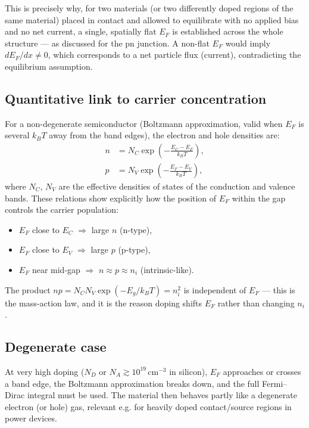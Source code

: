 \documentclass[11pt]{article}
\begin{document}
This is precisely why, for two materials (or two differently doped regions of the same material) placed in contact and allowed to equilibrate with no applied bias and no net current, a single, spatially flat $E_F$ is established across the whole structure — as discussed for the pn junction. A non-flat $E_F$ would imply $dE_F/dx \neq 0$, which corresponds to a net particle flux (current), contradicting the equilibrium assumption.

\subsection{Quantitative link to carrier concentration}

For a non-degenerate semiconductor (Boltzmann approximation, valid when $E_F$ is several $k_BT$ away from the band edges), the electron and hole densities are:
\begin{align}
n &= N_C \exp\!\left(-\frac{E_C - E_F}{k_BT}\right), \\
p &= N_V \exp\!\left(-\frac{E_F - E_V}{k_BT}\right),
\end{align}
where $N_C$, $N_V$ are the effective densities of states of the conduction and valence bands. These relations show explicitly how the position of $E_F$ within the gap controls the carrier population:
\begin{itemize}
\item $E_F$ close to $E_C$ $\Rightarrow$ large $n$ (n-type),
\item $E_F$ close to $E_V$ $\Rightarrow$ large $p$ (p-type),
\item $E_F$ near mid-gap $\Rightarrow$ $n \approx p \approx n_i$ (intrinsic-like).
\end{itemize}

The product $np = N_C N_V \exp(-E_g/k_BT) = n_i^2$ is independent of $E_F$ — this is the mass-action law, and it is the reason doping shifts $E_F$ rather than changing $n_i$.

\subsection{Degenerate case}
At very high doping ($N_D$ or $N_A \gtrsim 10^{19}\,\text{cm}^{-3}$ in silicon), $E_F$ approaches or crosses a band edge, the Boltzmann approximation breaks down, and the full Fermi--Dirac integral must be used. The material then behaves partly like a degenerate electron (or hole) gas, relevant e.g. for heavily doped contact/source regions in power devices.
\end{document}
